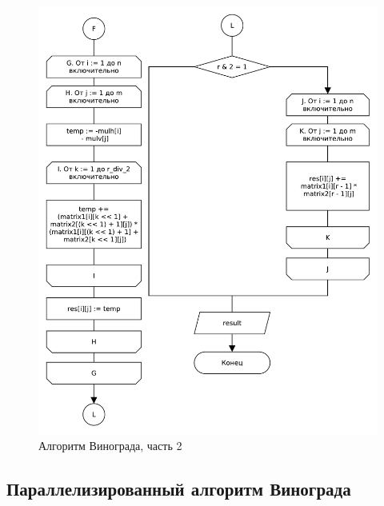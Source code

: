 \begin{figure}[H]
    \centering
    \includegraphics[scale=0.70]{pdf/owinograd-part2.pdf}
    \caption{Алгоритм Винограда, часть 2}
    \label{img:windograd2}
\end{figure}

\subsection{Параллелизированный алгоритм Винограда}

